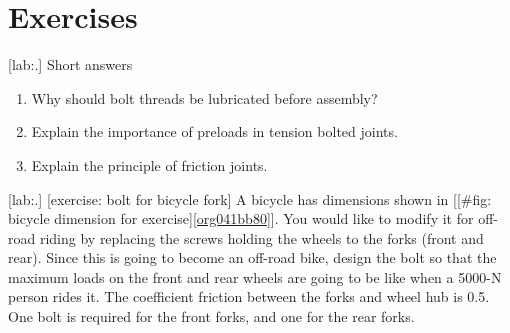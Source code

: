 \documentclass[a4paper,openany,12pt]{book}
\begin{document}
{{\section{Exercises}
\label{sec:orged2ee4e}
[lab:.] Short answers

\begin{enumerate}
\item Why should bolt threads be lubricated before assembly?

\item Explain the importance of preloads in tension bolted joints.

\item Explain the principle of friction joints.
\end{enumerate}

[lab:.]
[exercise: bolt for bicycle fork] A bicycle has dimensions shown in
[[\#fig: bicycle dimension for exercise]\ref{org041bb80}].
You would like to modify it for off-road riding by replacing the screws
holding the wheels to the forks (front and rear). Since this is going to
become an off-road bike, design the bolt so that the maximum loads on
the front and rear wheels are going to be like when a 5000-N person
rides it. The coefficient friction between the forks and wheel hub is
0.5. One bolt is required for the front forks, and one for the rear
forks.


}}
\end{document}
